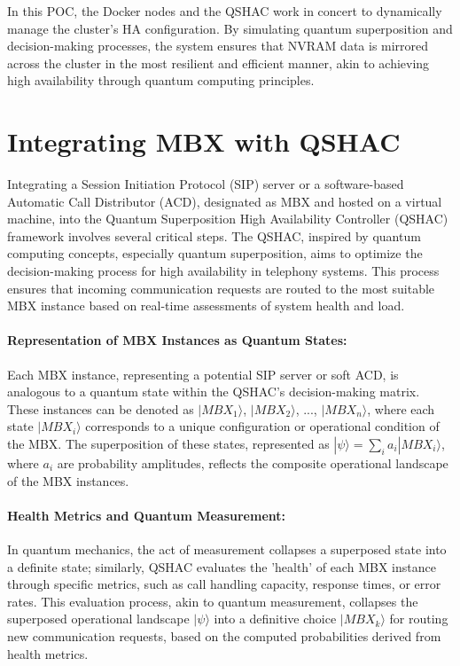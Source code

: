 \documentclass[12pt]{article}
\begin{document}
In this POC, the Docker nodes and the QSHAC work in concert to dynamically manage the cluster's HA configuration. By simulating quantum superposition and decision-making processes, the system ensures that NVRAM data is mirrored across the cluster in the most resilient and efficient manner, akin to achieving high availability through quantum computing principles.

\section{Integrating MBX with QSHAC}

Integrating a Session Initiation Protocol (SIP) server or a software-based Automatic Call Distributor (ACD), designated as MBX and hosted on a virtual machine, into the Quantum Superposition High Availability Controller (QSHAC) framework involves several critical steps. The QSHAC, inspired by quantum computing concepts, especially quantum superposition, aims to optimize the decision-making process for high availability in telephony systems. This process ensures that incoming communication requests are routed to the most suitable MBX instance based on real-time assessments of system health and load.

\paragraph{Representation of MBX Instances as Quantum States:} Each MBX instance, representing a potential SIP server or soft ACD, is analogous to a quantum state within the QSHAC's decision-making matrix. These instances can be denoted as \(|MBX_1\rangle\), \(|MBX_2\rangle\), ..., \(|MBX_n\rangle\), where each state \(|MBX_i\rangle\) corresponds to a unique configuration or operational condition of the MBX. The superposition of these states, represented as \(|\psi\rangle = \sum_{i} a_i |MBX_i\rangle\), where \(a_i\) are probability amplitudes, reflects the composite operational landscape of the MBX instances.

\paragraph{Health Metrics and Quantum Measurement:} In quantum mechanics, the act of measurement collapses a superposed state into a definite state; similarly, QSHAC evaluates the 'health' of each MBX instance through specific metrics, such as call handling capacity, response times, or error rates. This evaluation process, akin to quantum measurement, collapses the superposed operational landscape \(|\psi\rangle\) into a definitive choice \(|MBX_k\rangle\) for routing new communication requests, based on the computed probabilities derived from health metrics.
\end{document}
